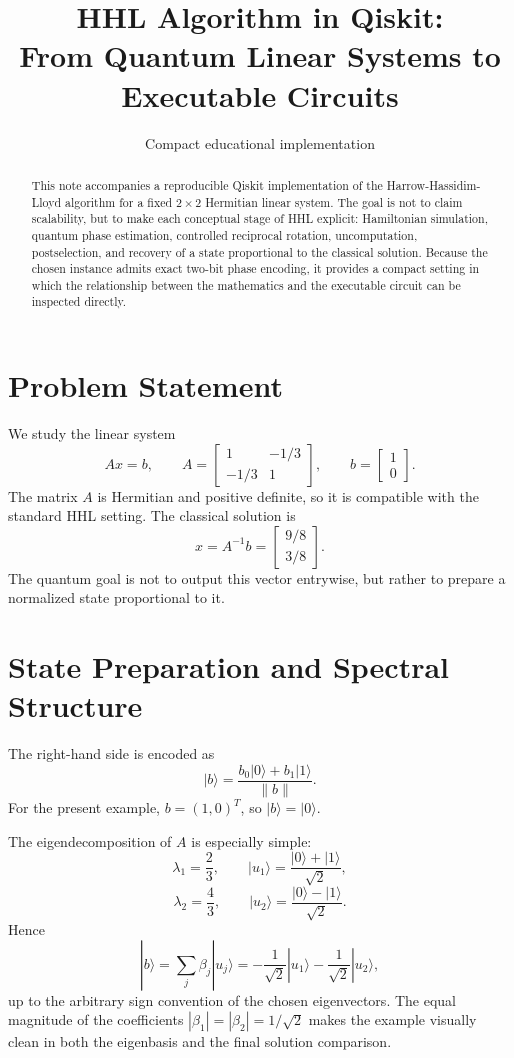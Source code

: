 \documentclass[11pt]{article}
\title{HHL Algorithm in Qiskit:\\From Quantum Linear Systems to Executable Circuits}
\author{Compact educational implementation}
\date{}
\begin{document}
\maketitle

\begin{abstract}
This note accompanies a reproducible Qiskit implementation of the Harrow-Hassidim-Lloyd algorithm for a fixed $2 \times 2$ Hermitian linear system. The goal is not to claim scalability, but to make each conceptual stage of HHL explicit: Hamiltonian simulation, quantum phase estimation, controlled reciprocal rotation, uncomputation, postselection, and recovery of a state proportional to the classical solution. Because the chosen instance admits exact two-bit phase encoding, it provides a compact setting in which the relationship between the mathematics and the executable circuit can be inspected directly.
\end{abstract}

\section{Problem Statement}

We study the linear system
\[
A x = b,
\qquad
A =
\begin{bmatrix}
1 & -1/3 \\
-1/3 & 1
\end{bmatrix},
\qquad
b =
\begin{bmatrix}
1 \\
0
\end{bmatrix}.
\]
The matrix $A$ is Hermitian and positive definite, so it is compatible with the standard HHL setting. The classical solution is
\[
x = A^{-1}b =
\begin{bmatrix}
9/8 \\
3/8
\end{bmatrix}.
\]
The quantum goal is not to output this vector entrywise, but rather to prepare a normalized state proportional to it.

\section{State Preparation and Spectral Structure}

The right-hand side is encoded as
\[
|b\rangle = \frac{b_0|0\rangle + b_1|1\rangle}{\|b\|}.
\]
For the present example, $b = (1,0)^T$, so $|b\rangle = |0\rangle$.

The eigendecomposition of $A$ is especially simple:
\[
\lambda_1 = \frac{2}{3},
\qquad
|u_1\rangle = \frac{|0\rangle + |1\rangle}{\sqrt{2}},
\]
\[
\lambda_2 = \frac{4}{3},
\qquad
|u_2\rangle = \frac{|0\rangle - |1\rangle}{\sqrt{2}}.
\]
Hence
\[
|b\rangle = \sum_j \beta_j |u_j\rangle
= -\frac{1}{\sqrt{2}}|u_1\rangle - \frac{1}{\sqrt{2}}|u_2\rangle,
\]
up to the arbitrary sign convention of the chosen eigenvectors. The equal magnitude of the coefficients $|\beta_1| = |\beta_2| = 1/\sqrt{2}$ makes the example visually clean in both the eigenbasis and the final solution comparison.
\end{document}
